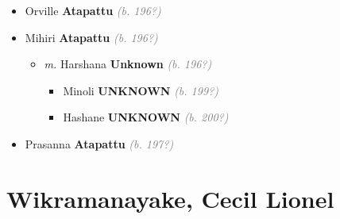 \documentclass[10pt, openany]{book}
\begin{document}
\begin{itemize}
{\begin{itemize}
{\begin{itemize}
{\begin{itemize}
\item{Orville \textbf{Atapattu} \textcolor{gray}{\textit{(b. 196?)}}
 }
\item{Mihiri \textbf{Atapattu} \textcolor{gray}{\textit{(b. 196?)}}
\begin{itemize}
\item{\textit{m.} Harshana \textbf{Unknown} \textcolor{gray}{\textit{(b. 196?)}}   \label{couple:00003659:00003661} \begin{itemize}
\item{Minoli \textbf{UNKNOWN} \textcolor{gray}{\textit{(b. 199?)}}
 }
\item{Hashane \textbf{UNKNOWN} \textcolor{gray}{\textit{(b. 200?)}}
 }
\end{itemize}}
\end{itemize}
 }
\item{Prasanna \textbf{Atapattu} \textcolor{gray}{\textit{(b. 197?)}}
 }
\end{itemize}}
\end{itemize}
  }
\end{itemize}}
\end{itemize}
 
\part{Wikramanayake, Cecil Lionel}
\end{document}
